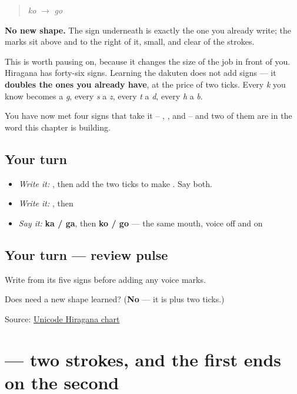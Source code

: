 \begin{quote}
 \emph{ko} $\to$ \textbf{} \emph{go}
\end{quote}

\textbf{No new shape.} The sign underneath is exactly the one you already write; the marks sit above and to the right of it, small, and clear of the strokes.

This is worth pausing on, because it changes the size of the job in front of you. Hiragana has forty-six signs. Learning the dakuten does not add signs — it \textbf{doubles the ones you already have}, at the price of two ticks. Every \emph{k} you know becomes a \emph{g}, every \emph{s} a \emph{z}, every \emph{t} a \emph{d}, every \emph{h} a \emph{b}.

You have now met four signs that take it -- , ,  and  -- and two of them are in the word this chapter is building.

\subsection*{Your turn}
\begin{itemize}
\raggedright
  \item \emph{Write it:} , then add the two ticks to make . Say both.
  \item \emph{Write it:} , then 
  \item \emph{Say it:} \textbf{ka / ga}, then \textbf{ko / go} — the same mouth, voice off and on
\end{itemize}

\subsection*{Your turn — review pulse}
Write \textbf{} from its five signs before adding any voice marks.

\begin{tcolorbox}[breakable,colback=teal!4,colframe=teal!35!black,title={Before you move on}]
Does  need a new shape learned? (\textbf{No} — it is  plus two ticks.)

Source: \href{https://www.unicode.org/charts/PDF/U3040.pdf}{Unicode Hiragana chart}
\end{tcolorbox}
\section[\texorpdfstring{\ja{と} (to)}{と (to)}]{ — two strokes, and the first ends on the second}

